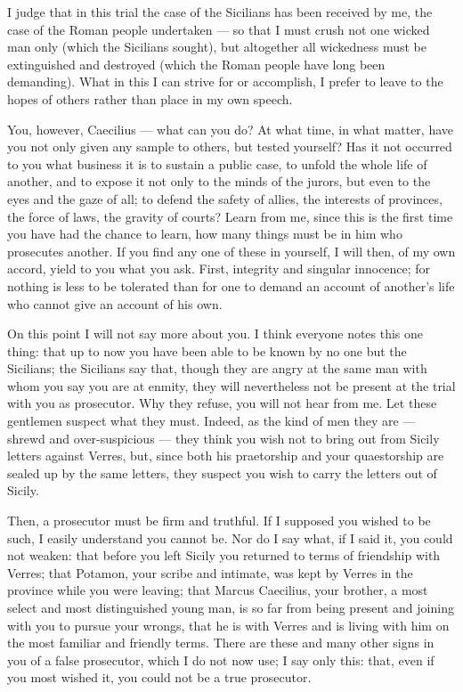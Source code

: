  I judge that in this trial the case of the Sicilians has been received by me, the case of the Roman people undertaken --- so that I must crush not one wicked man only (which the Sicilians sought), but altogether all wickedness must be extinguished and destroyed (which the Roman people have long been demanding). What in this I can strive for or accomplish, I prefer to leave to the hopes of others rather than place in my own speech.

 You, however, Caecilius --- what can you do? At what time, in what matter, have you not only given any sample to others, but tested yourself? Has it not occurred to you what business it is to sustain a public case, to unfold the whole life of another, and to expose it not only to the minds of the jurors, but even to the eyes and the gaze of all; to defend the safety of allies, the interests of provinces, the force of laws, the gravity of courts? Learn from me, since this is the first time you have had the chance to learn, how many things must be in him who prosecutes another. If you find any one of these in yourself, I will then, of my own accord, yield to you what you ask. First, integrity and singular innocence; for nothing is less to be tolerated than for one to demand an account of another's life who cannot give an account of his own.

 On this point I will not say more about you. I think everyone notes this one thing: that up to now you have been able to be known by no one but the Sicilians; the Sicilians say that, though they are angry at the same man with whom you say you are at enmity, they will nevertheless not be present at the trial with you as prosecutor. Why they refuse, you will not hear from me. Let these gentlemen suspect what they must. Indeed, as the kind of men they are --- shrewd and over-suspicious --- they think you wish not to bring out from Sicily letters against Verres, but, since both his praetorship and your quaestorship are sealed up by the same letters, they suspect you wish to carry the letters out of Sicily.

 Then, a prosecutor must be firm and truthful. If I supposed you wished to be such, I easily understand you cannot be. Nor do I say what, if I said it, you could not weaken: that before you left Sicily you returned to terms of friendship with Verres; that Potamon, your scribe and intimate, was kept by Verres in the province while you were leaving; that Marcus Caecilius, your brother, a most select and most distinguished young man, is so far from being present and joining with you to pursue your wrongs, that he is with Verres and is living with him on the most familiar and friendly terms. There are these and many other signs in you of a false prosecutor, which I do not now use; I say only this: that, even if you most wished it, you could not be a true prosecutor.

